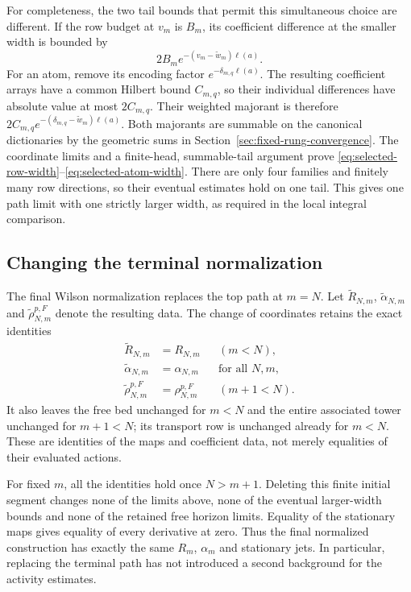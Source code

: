 For completeness, the two tail bounds that permit this simultaneous
choice are different. If the row budget at $v_m$ is $B_m$, its
coefficient difference at the smaller width is bounded by
\[2B_m e^{-(v_m-\widetilde w_m)\ell(a)}.\]
For an atom, remove its
encoding factor $e^{-\delta_{m,q}\ell(a)}$. The resulting coefficient
arrays have a common Hilbert bound $C_{m,q}$, so their individual
differences have absolute value at most $2C_{m,q}$. Their weighted
majorant is therefore
$2C_{m,q}e^{-(\delta_{m,q}-\widetilde w_m)\ell(a)}$.
Both majorants are summable on the canonical dictionaries by the
geometric sums in Section~\ref{sec:fixed-rung-convergence}. The
coordinate limits and a finite-head, summable-tail argument prove
\eqref{eq:selected-row-width}--\eqref{eq:selected-atom-width}.
There are only four families and finitely many row directions, so
their eventual estimates hold on one tail. This gives one path
limit with one strictly larger width, as required in the local
integral comparison.

\subsection{Changing the terminal normalization}
The final Wilson normalization replaces the top path at $m=N$.
Let $\widetilde R_{N,m}$, $\widetilde\alpha_{N,m}$ and
$\widetilde\rho_{N,m}^{p,F}$ denote the resulting data. The change
of coordinates retains the exact identities
\begin{align*}
 \widetilde R_{N,m}&=R_{N,m}&& (m<N),\\
 \widetilde\alpha_{N,m}&=\alpha_{N,m}&&\text{for all }N,m,\\
 \widetilde\rho_{N,m}^{p,F}&=\rho_{N,m}^{p,F}&&(m+1<N).
\end{align*}
It also leaves the free bed unchanged for $m<N$ and the entire
associated tower unchanged for $m+1<N$; its transport row is
unchanged already for $m<N$. These are identities of the maps and
coefficient data, not merely equalities of their evaluated actions.

For fixed $m$, all the identities hold once $N>m+1$. Deleting this
finite initial segment changes none of the limits above, none of
the eventual larger-width bounds and none of the retained free
horizon limits. Equality of the stationary maps gives equality of
every derivative at zero. Thus the final normalized construction
has exactly the same $R_m$, $\alpha_m$ and stationary jets. In
particular, replacing the terminal path has not introduced a second
background for the activity estimates.

